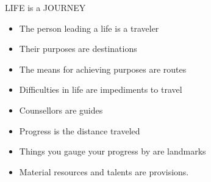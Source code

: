 \begin{frame}{LIFE is a JOURNEY}
\begin{itemize}
\item The person leading a life is a traveler
\item Their purposes are destinations
\item The means for achieving purposes are routes
\item Difficulties in life are impediments to travel
\item Counsellors are guides
\item Progress is the distance traveled
\item Things you gauge your progress by are landmarks
\item Material resources and talents are provisions.
\end{itemize}


\end{frame}



